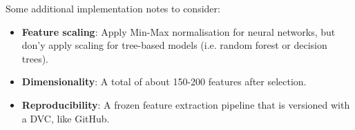 \noindent Some additional implementation notes to consider: 

\begin{itemize}
  \item \textbf{Feature scaling}: Apply Min-Max normalisation for neural networks, but don'y apply scaling for tree-based models (i.e. random forest or decision trees).
  \item \textbf{Dimensionality}: A total of about 150-200 features after selection.
  \item \textbf{Reproducibility}: A frozen feature extraction pipeline that is versioned with a DVC, like GitHub.
\end{itemize}
